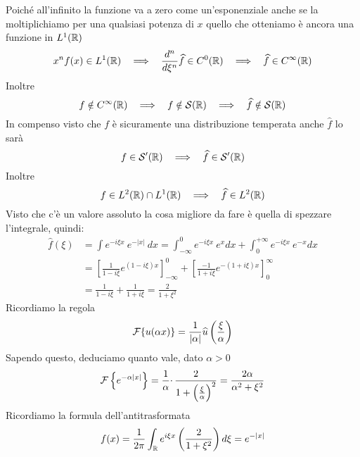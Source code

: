 Poiché all'infinito la funzione va a zero come un'esponenziale anche se la moltiplichiamo per una qualsiasi potenza di $x$ quello che otteniamo è ancora una funzione in $L^{1} (\mathbb{R}  )$
\begin{equation*}
x^{n} f(x)\in L^{1} (\RR  )\ \ \implies \ \ \frac{d^{n}}{d\xi ^{n}}\hat{f} \in C^{0}(\RR ) \ \ \implies \ \ \hat{f} \in C^{\infty } (\RR  )
\end{equation*}
Inoltre
\begin{equation*}
f\notin C^{\infty } (\RR  )\ \ \implies \ \ f\notin \Sc (\RR ) \ \ \implies \ \ \hat{f} \notin \Sc (\RR )
\end{equation*}
In compenso visto che $f$ è sicuramente una distribuzione temperata anche $\hat{f}$ lo sarà
\begin{equation*}
f\in \Sc  '(\RR ) \ \ \implies \ \ \hat{f} \in \Sc  '(\RR )
\end{equation*}
Inoltre
\begin{equation*}
f\in L^{2}(\RR ) \cap L^{1}(\RR ) \ \ \implies \ \ \hat{f} \in L^{2}(\RR )
\end{equation*}
Visto che c'è un valore assoluto la cosa migliore da fare è quella di spezzare l'integrale, quindi:
\begin{equation*}
\begin{aligned}
\hat{f} (\xi ) & =\int e^{-i\xi x} \ e^{-|x|} \ dx=\int ^{0}_{-\infty } e^{-i\xi x} \ e^{x} dx+\int ^{+\infty }_{0} e^{-i\xi x} \ e^{-x} dx\\
 & =\left[\frac{1}{1-i\xi } e^{( 1-i\xi ) x}\right]^{0}_{-\infty } +\left[\frac{-1}{1+i\xi } e^{-( 1+i\xi ) x}\right]^{\infty }_{0}\\
 & =\frac{1}{1-i\xi } +\frac{1}{1+i\xi } =\frac{2}{1+\xi ^{2}}
\end{aligned}
\end{equation*}
Ricordiamo la regola
\begin{equation*}
\mathcal{F} \{u(\alpha x)\} =\frac{1}{| \alpha | }\widehat{u}\left(\frac{\xi }{\alpha }\right)
\end{equation*}
Sapendo questo, deduciamo quanto vale, dato $\alpha  >0$
\begin{equation*}
\mathcal{F} \left\{e^{-\alpha | x| }\right\} =\frac{1}{\alpha } \cdotp \frac{2}{1+\left(\frac{\xi }{\alpha }\right)^{2}} =\frac{2\alpha }{\alpha ^{2} +\xi ^{2}}
\end{equation*}
Ricordiamo la formula dell'antitrasformata
\begin{equation*}
f( x) =\frac{1}{2\pi }\int _{\mathbb{R} } e^{i\xi x}\left(\frac{2}{1+\xi ^{2}}\right) d\xi =e^{-|x|}
\end{equation*}
